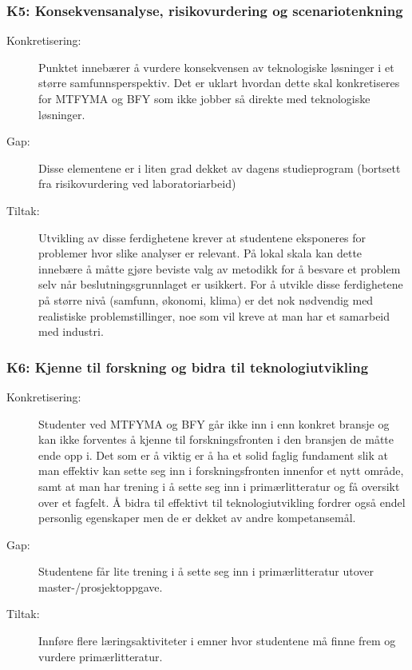 \subsubsection{K5: Konsekvensanalyse, risikovurdering og scenariotenkning}
\begin{description}
\item[Konkretisering:] Punktet innebærer å vurdere konsekvensen av teknologiske løsninger i et større samfunnsperspektiv. Det er uklart hvordan dette skal konkretiseres for MTFYMA og BFY som ikke jobber så direkte med teknologiske løsninger.
\item[Gap:]Disse elementene er i liten grad dekket av dagens studieprogram (bortsett fra risikovurdering ved laboratoriarbeid)
\item[Tiltak:]Utvikling av disse ferdighetene krever at studentene eksponeres for problemer hvor slike analyser er relevant. På lokal skala kan dette innebære å måtte gjøre beviste valg av metodikk for å besvare et problem selv når beslutningsgrunnlaget er usikkert. For å utvikle disse ferdighetene på større nivå (samfunn, økonomi, klima) er det nok nødvendig med realistiske problemstillinger, noe som vil kreve at man har et samarbeid med industri.
\end{description}

\subsubsection{K6: Kjenne til forskning og bidra til teknologiutvikling}
\begin{description}
\item[Konkretisering:] Studenter ved MTFYMA og BFY går ikke inn i enn konkret bransje og kan ikke forventes å kjenne til forskningsfronten i den bransjen de måtte ende opp i. Det som er å viktig er å ha et solid faglig fundament slik at man effektiv kan sette seg inn i forskningsfronten innenfor et nytt område, samt at man har trening i å sette seg inn i primærlitteratur og få oversikt over et fagfelt. Å bidra til effektivt til teknologiutvikling fordrer også endel personlig egenskaper men de er dekket av andre kompetansemål.
\item[Gap:] Studentene får lite trening i å sette seg inn i primærlitteratur utover master-/prosjektoppgave.
\item[Tiltak:] Innføre flere læringsaktiviteter i emner hvor studentene må finne frem og vurdere primærlitteratur.
\end{description}

